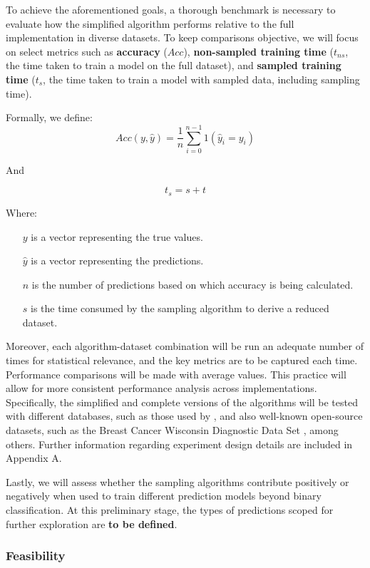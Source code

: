 \documentclass{article}
\theoremstyle{plain}
\theoremstyle{definition}
\theoremstyle{remark}
\begin{document}
To achieve the aforementioned goals, a thorough benchmark is necessary to evaluate how the simplified algorithm performs relative to the full implementation in diverse datasets. To keep comparisons objective, we will focus on select metrics such as \textbf{accuracy} ($Acc$),  \textbf{non-sampled training time} ($t_{ns}$, the time taken to train a model on the full dataset), and \textbf{sampled training time} ($t_s$,  the time taken to train a model with sampled data, including sampling time).

Formally, we define:
$$
Acc(y, \hat{y}) = \frac{1}{n} \sum_{i=0}^{n-1} 1(\hat{y}_i = y_i)
$$

And

$$
t_s = s + t
$$

Where:

\begin{itemize}

\item[$y$] is a vector representing the true values.
\item[$\hat{y}$] is a vector representing the predictions.
\item[$n$] is the number of predictions based on which accuracy is being calculated.
\item[$s$] is the time consumed by the sampling algorithm to derive a reduced dataset.

\end{itemize}

Moreover, each algorithm-dataset combination will be run an adequate number of times for statistical relevance, and the key metrics are to be captured each time. Performance comparisons will be made with average values. This practice will allow for more consistent performance analysis across implementations. Specifically, the simplified and complete versions of the algorithms will be tested with different databases, such as those used by \citeauthor{chow24}, and also well-known open-source datasets, such as the Breast Cancer Wisconsin Diagnostic Data Set \cite{breastcancer}, among others. Further information regarding experiment design details are included in Appendix A.

Lastly, we will assess whether the sampling algorithms contribute positively or negatively when used to train different prediction models beyond binary classification. At this preliminary stage, the types of predictions scoped for further exploration are \textbf{to be defined}.


\subsubsection{Feasibility}
\end{document}
